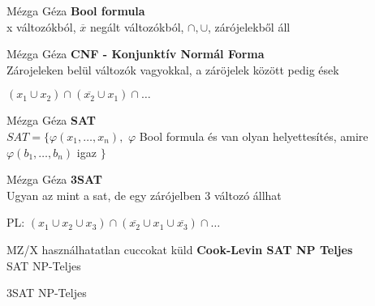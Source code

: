 \begin{definicio}{Mézga Géza}
	 \textbf{Bool formula} \\[3pt]
	 x változókból, $\overline{x}$ negált változókból, $\cap , \cup$, zárójelekből áll \\[0pt]
\end{definicio}

\begin{definicio}{Mézga Géza}
	 \textbf{CNF - Konjunktív Normál Forma} \\[3pt]
	 Zárojeleken belül változók vagyokkal, a záröjelek között pedig ések

	 $(x_1 \cup x_2) \cap (\overline{x_2} \cup x_1) \cap \ldots$ \\[0pt]
\end{definicio}

\begin{definicio}{Mézga Géza}
	 \textbf{SAT} \\[3pt]
	 $SAT = \lbrace \varphi (x_1,\ldots , x_n),$ $\varphi$ Bool formula és van olyan helyettesítés, amire $\varphi (b_1,\ldots ,b_n)$ igaz  $\rbrace$\\[0pt]
\end{definicio}

\begin{definicio}{Mézga Géza}
	 \textbf{3SAT} \\[3pt]
	 Ugyan az mint a sat, de egy zárójelben 3 változó állhat

	 PL: $(x_1 \cup x_2 \cup x_3) \cap (\overline{x_2} \cup x_1 \cup \overline{x_3}) \cap \ldots$\\[0pt]
\end{definicio}

	 \begin{tetel}{MZ/X használhatatlan cuccokat küld}
    \textbf{Cook-Levin SAT NP Teljes} \\[3pt]
	 SAT NP-Teljes

	 3SAT NP-Teljes\\[4pt]
   \end{tetel}

	 \notBiz\\[0pt]
